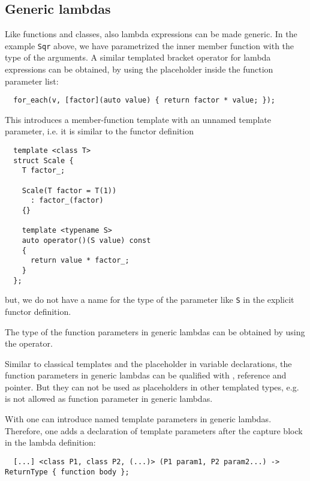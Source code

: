 \subsection{Generic lambdas}
Like functions and classes, also lambda expressions can be made generic. In the example \texttt{Sqr} above, we have parametrized the
inner member function  with the type of the arguments. A similar templated bracket operator for lambda expressions
can be obtained, by using the placeholder  inside the function parameter list:
%
\begin{verbatim}
  for_each(v, [factor](auto value) { return factor * value; });
\end{verbatim}
%
This introduces a member-function template with an unnamed template parameter, i.e. it is similar to the functor definition
%
\begin{verbatim}
  template <class T>
  struct Scale {
    T factor_;

    Scale(T factor = T(1))
      : factor_(factor)
    {}

    template <typename S>
    auto operator()(S value) const
    {
      return value * factor_;
    }
  };
\end{verbatim}
%
but, we do not have a name for the type of the parameter like \texttt{S} in the explicit functor definition.

\begin{rem}
  The type of the function parameters in generic lambdas can be obtained by using the  operator.
\end{rem}

Similar to classical templates and the  placeholder in variable declarations, the function parameters in generic lambdas
can be qualified with , reference and pointer. But they can not be used as placeholders in other templated types, e.g.
 is not allowed as function parameter in generic lambdas.

\begin{rem}
  With \marginpar{[\cxx{20}]} one can introduce named template parameters in generic lambdas. Therefore, one adds a declaration
  of template parameters after the capture block in the lambda definition:
  \begin{verbatim}
  [...] <class P1, class P2, (...)> (P1 param1, P2 param2...) -> ReturnType { function body };
  \end{verbatim}
\end{rem}


